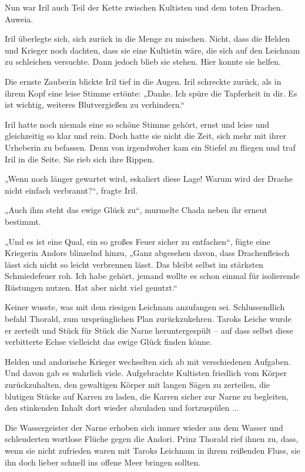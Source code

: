Nun war Iril auch Teil der Kette zwischen Kultisten und dem toten Drachen. Auweia.

Iril überlegte sich, sich zurück in die Menge zu mischen. Nicht, dass die Helden und Krieger noch dachten, dass sie eine Kultistin wäre, die sich auf den Leichnam zu schleichen versuchte. Dann jedoch blieb sie stehen. Hier konnte sie helfen.

Die ernste Zauberin blickte Iril tief in die Augen. Iril schreckte zurück, als in ihrem Kopf eine leise Stimme ertönte: „Danke. Ich spüre die Tapferkeit in dir. Es ist wichtig, weiteres Blutvergießen zu verhindern.“

Iril hatte noch niemals eine so schöne Stimme gehört, ernst und leise und gleichzeitig so klar und rein. Doch hatte sie nicht die Zeit, sich mehr mit ihrer Urheberin zu befassen. Denn von irgendwoher kam ein Stiefel zu fliegen und traf Iril in die Seite. Sie rieb sich ihre Rippen.

„Wenn noch länger gewartet wird, eskaliert diese Lage! Warum wird der Drache nicht einfach verbrannt?“, fragte Iril.

„Auch ihm steht das ewige Glück zu“, murmelte Chada neben ihr erneut bestimmt.

„Und es ist eine Qual, ein so großes Feuer sicher zu entfachen“, fügte eine Kriegerin Andors blinzelnd hinzu, „Ganz abgesehen davon, dass Drachenfleisch lässt sich nicht so leicht verbrennen lässt. Das bleibt selbst im stärksten Schmiedefeuer roh. Ich habe gehört, jemand wollte es schon einmal für isolierende Rüstungen nutzen. Hat aber nicht viel genutzt.“

Keiner wusste, was mit dem riesigen Leichnam anzufangen sei. Schlussendlich befahl Thorald, zum ursprünglichen Plan zurückzukehren. Taroks Leiche wurde er zerteilt und Stück für Stück die Narne heruntergespült – auf dass selbst diese verbitterte Echse vielleicht das ewige Glück finden könne.

Helden und andorische Krieger wechselten sich ab mit verschiedenen Aufgaben. Und davon gab es wahrlich viele. Aufgebrachte Kultisten friedlich vom Körper zurückzuhalten, den gewaltigen Körper mit langen Sägen zu zerteilen, die blutigen Stücke auf Karren zu laden, die Karren sicher zur Narne zu begleiten, den stinkenden Inhalt dort wieder abzuladen und fortzuspülen ...

Die Wassergeister der Narne erhoben sich immer wieder aus dem Wasser und schleuderten wortlose Flüche gegen die Andori. Prinz Thorald rief ihnen zu, dass, wenn sie nicht zufrieden waren mit Taroks Leichnam in ihrem reißenden Fluss, sie ihn doch lieber schnell ins offene Meer bringen sollten.

